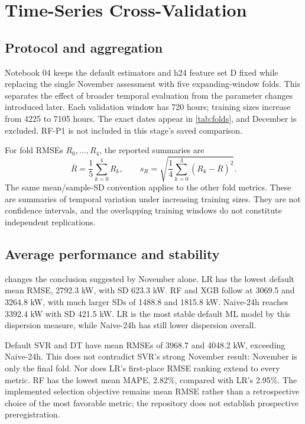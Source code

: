 \section{Time-Series Cross-Validation}\label{sec:cv}
\subsection{Protocol and aggregation}
Notebook 04 keeps the default estimators and h24 feature set D fixed while replacing the single November assessment with five expanding-window folds. This separates the effect of broader temporal evaluation from the parameter changes introduced later. Each validation window has 720 hours; training sizes increase from \num{4225} to \num{7105} hours. The exact dates appear in \cref{tab:folds}, and December is excluded. RF-P1 is not included in this stage's saved comparison.

For fold RMSEs $R_0,\ldots,R_4$, the reported summaries are
\begin{equation}
\overline R=\frac{1}{5}\sum_{k=0}^{4}R_k,\qquad
s_R=\sqrt{\frac{1}{4}\sum_{k=0}^{4}(R_k-\overline R)^2}.
\label{eq:cv_summary}
\end{equation}
The same mean/sample-SD convention applies to the other fold metrics. These are summaries of temporal variation under increasing training sizes. They are not confidence intervals, and the overlapping training windows do not constitute independent replications.

\subsection{Average performance and stability}
 changes the conclusion suggested by November alone. LR has the lowest default mean RMSE, \num{2792.3} kW, with SD \num{623.3} kW. RF and XGB follow at \num{3069.5} and \num{3264.8} kW, with much larger SDs of \num{1488.8} and \num{1815.8} kW. Naive-24h reaches \num{3392.4} kW with SD \num{421.5} kW. LR is the most stable default ML model by this dispersion measure, while Naive-24h has still lower dispersion overall.


Default SVR and DT have mean RMSEs of \num{3968.7} and \num{4048.2} kW, exceeding Naive-24h. This does not contradict SVR's strong November result: November is only the final fold. Nor does LR's first-place RMSE ranking extend to every metric. RF has the lowest mean MAPE, \num{2.82}\%, compared with LR's \num{2.95}\%. The implemented selection objective remains mean RMSE rather than a retrospective choice of the most favorable metric; the repository does not establish prospective preregistration.

